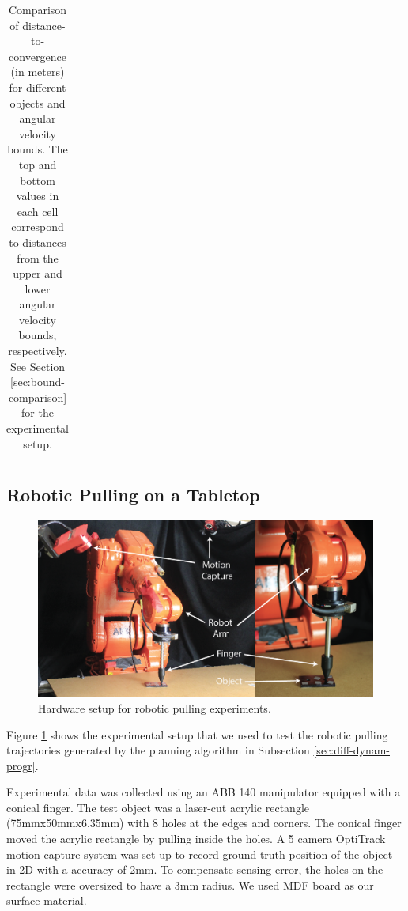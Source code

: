\documentclass[conference]{IEEEtran}
\begin{document}
\begin{table}[t]
\begin{center}
\begin{tabular}[c]{cccc}
        \bottomrule
      \end{tabular}
  \end{center}
  \caption{Comparison of distance-to-convergence (in meters) for different objects and angular velocity bounds. The top and bottom values in each cell correspond to distances from the upper and lower angular velocity bounds, respectively. See Section \ref{sec:bound-comparison} for the experimental setup.}
  \label{table:convergence-distance}
\end{table}

\subsection{Robotic Pulling on a Tabletop}
\begin{figure}
\begin{center}
  \includegraphics[width=\columnwidth]{fig/hardware.png}
\end{center}
\caption{Hardware setup for robotic pulling experiments.}
\label{fig:hardware}
\end{figure}

Figure \ref{fig:hardware} shows the experimental setup that we used to
test the robotic pulling trajectories generated by the planning
algorithm in Subsection \ref{sec:diff-dynam-progr}.


Experimental data was collected using an ABB 140 manipulator equipped
with a conical finger. The test object was a laser-cut acrylic
rectangle (75mmx50mmx6.35mm) with 8 holes at the edges and
corners. The conical finger moved the acrylic rectangle by pulling
inside the holes.  A 5 camera OptiTrack motion capture system was set
up to record ground truth position of the object in 2D with a accuracy
of 2mm. To compensate sensing error, the holes on the rectangle were
oversized to have a 3mm radius. We used MDF board as our surface
material.
\end{document}
